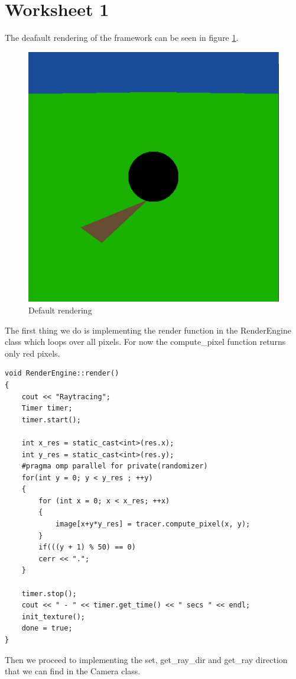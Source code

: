 \section{Worksheet 1}
The deafault rendering of the framework can be seen in figure \ref{fig:preview}.
\begin{figure}[H]
	\centering
	\includegraphics[scale=\imagescale]{images/worksheet_1/preview}
	\caption{Default rendering}
	\label{fig:preview}
\end{figure}
The first thing we do is implementing the render function in the RenderEngine class which loops over all pixels. For now the compute\_pixel function returns only red pixels.
\begin{lstlisting}
void RenderEngine::render()
{
	cout << "Raytracing";
	Timer timer;
	timer.start();
	
	int x_res = static_cast<int>(res.x);
	int y_res = static_cast<int>(res.y);
	#pragma omp parallel for private(randomizer)
	for(int y = 0; y < y_res ; ++y)
	{
		for (int x = 0; x < x_res; ++x)
		{
			image[x+y*y_res] = tracer.compute_pixel(x, y);
		}
		if(((y + 1) % 50) == 0) 
		cerr << ".";
	}
	
	timer.stop();
	cout << " - " << timer.get_time() << " secs " << endl;
	init_texture();
	done = true;
}
\end{lstlisting}
Then we proceed to implementing the set, get\_ray\_dir and get\_ray direction that we can find in the Camera class.

